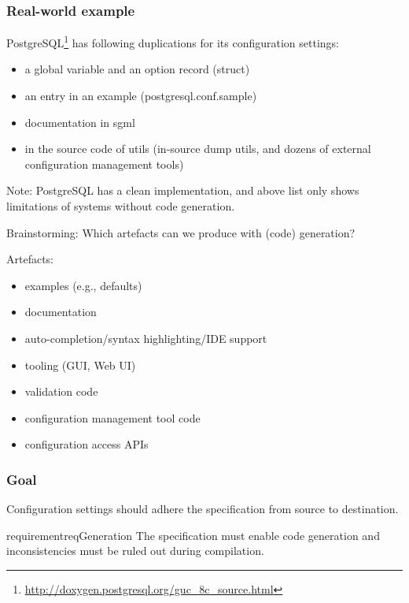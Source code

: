 \begin{frame}[fragile]
	\frametitle{Real-world example}
	PostgreSQL\footnote{\url{http://doxygen.postgresql.org/guc_8c_source.html}} has following duplications for its configuration settings:
	\begin{itemize}
	\item a global variable and an option record (struct)
	\item an entry in an example (postgresql.conf.sample)
	\item documentation in sgml
	\item in the source code of utils (in-source dump utils, and dozens of external configuration management tools)
	\end{itemize}
	\pause
	\vspace{1em}
	Note: PostgreSQL has a clean implementation, and above list only shows limitations of systems without code generation.
\end{frame}

\begin{assignment}
	\begin{task}
	Brainstorming: Which artefacts can we produce with (code) generation?
	\end{task}
\end{assignment}

\begin{frame}
	Artefacts:
	\begin{itemize}
	\item examples (e.g., defaults)
	\item documentation
	\item auto-completion/syntax highlighting/IDE support
	\item tooling (GUI, Web UI)
	\item validation code
	\item configuration management tool code
	\item configuration access APIs
	\end{itemize}
\end{frame}

\begin{frame}
	\frametitle{Goal}

	\begin{goal}
	Configuration settings should adhere the specification from source to destination.
	\end{goal}

	\begin{restatable}{requirement}{reqGeneration}
	The specification must enable code generation and inconsistencies must be ruled out during compilation.
	\end{restatable}
\end{frame}


